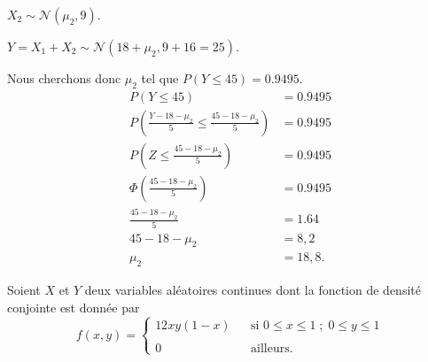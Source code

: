 \begin{questions}
\begin{parts}
\begin{solution}
    $X_2\sim\mathcal{N}(\mu_2, 9)$.

    $Y = X_1 + X_2 \sim \mathcal{N}(18+\mu_2, 9+16=25)$.
    
    Nous cherchons donc $\mu_2$ tel que $P(Y\leq 45)=0.9495$.
    \begin{align*}
    P(Y\leq 45)&=0.9495\\
    P\left(\frac{Y-18-\mu_2}{5} \leq\frac{45-18-\mu_2}{5}\right)&= 0.9495\\
    P\left(Z \leq \frac{45-18-\mu_2}{5}\right)&=0.9495\\
    \Phi\left(\frac{45 - 18 - \mu_2}{5}\right)&=0.9495\\
    \frac{45-18-\mu_2}{5}&=1.64\\
    45-18-\mu_2&= 8,2\\
    \mu_2 &= 18,8.
    \end{align*}
\end{solution}
\end{parts}



\newpage

\question\label{conjointe} 

Soient $X$ et $Y$ deux variables aléatoires continues dont la fonction de densité conjointe est donnée par
$$f(x,y) = \left \{
\begin{array}{lcl}
    12xy(1-x) & &\text{si } 0 \leq x \leq 1 \; ;\;  0 \leq y \leq 1\\
    & & \\
    0               & &\text{ailleurs. }
\end{array}
\right.$$

\end{questions}
